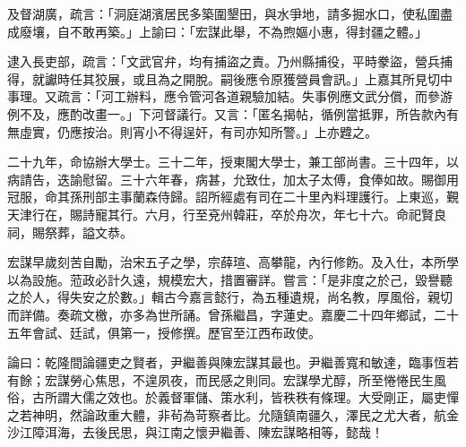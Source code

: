 \begin{pinyinscope}
及督湖廣，疏言：「洞庭湖濱居民多築圍墾田，與水爭地，請多掘水口，使私圍盡成廢壤，自不敢再築。」上諭曰：「宏謀此舉，不為煦嫗小惠，得封疆之體。」

逮入長吏部，疏言：「文武官弁，均有捕盜之責。乃州縣捕役，平時豢盜，營兵捕得，就讞時任其狡展，或且為之開脫。嗣後應令原獲營員會訊。」上嘉其所見切中事理。又疏言：「河工辦料，應令管河各道親驗加結。失事例應文武分償，而參游例不及，應酌改畫一。」下河督議行。又言：「匿名揭帖，循例當抵罪，所告款內有無虛實，仍應按治。則宵小不得逞奸，有司亦知所警。」上亦韙之。

二十九年，命協辦大學士。三十二年，授東閣大學士，兼工部尚書。三十四年，以病請告，迭諭慰留。三十六年春，病甚，允致仕，加太子太傅，食俸如故。賜御用冠服，命其孫刑部主事蘭森侍歸。詔所經處有司在二十里內料理護行。上東巡，覲天津行在，賜詩寵其行。六月，行至兗州韓莊，卒於舟次，年七十六。命祀賢良祠，賜祭葬，謚文恭。

宏謀早歲刻苦自勵，治宋五子之學，宗薛瑄、高攀龍，內行修飭。及入仕，本所學以為設施。蒞政必計久遠，規模宏大，措置審詳。嘗言：「是非度之於己，毀譽聽之於人，得失安之於數。」輯古今嘉言懿行，為五種遺規，尚名教，厚風俗，親切而詳備。奏疏文檄，亦多為世所誦。曾孫繼昌，字蓮史。嘉慶二十四年鄉試，二十五年會試、廷試，俱第一，授修撰。歷官至江西布政使。

論曰：乾隆間論疆吏之賢者，尹繼善與陳宏謀其最也。尹繼善寬和敏達，臨事恆若有餘；宏謀勞心焦思，不遑夙夜，而民感之則同。宏謀學尤醇，所至惓惓民生風俗，古所謂大儒之效也。於義督軍儲、策水利，皆秩秩有條理。大受剛正，屬吏憚之若神明，然論政重大體，非茍為苛察者比。允隨鎮南疆久，澤民之尤大者，航金沙江障洱海，去後民思，與江南之懷尹繼善、陳宏謀略相等，懿哉！


\end{pinyinscope}